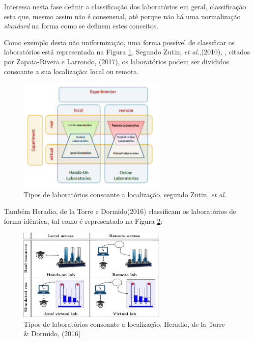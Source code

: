 Interessa nesta fase definir a classificação dos laboratórios em geral, classificação esta que, mesmo assim não é consensual, até porque não há uma normalização \textit{standard} na forma como se definem estes conceitos.

Como exemplo desta não uniformização, uma forma possível de classificar os laboratórios está representada na Figura \ref{fig:classificaçãozutin}. Segundo Zutin, \textit{et al.},(2010), \cite{zutinlab2go}, citados por Zapata-Rivera e Larrondo, (2017), \cite{Zapata-Rivera} os laboratórios podem ser divididos consoante a sua localização: local ou remota.

\begin{figure}[hbtp]
    \centering
    \includegraphics[width=0.65\textwidth]{figures/carac_lab.png}
    \caption{Tipos de laboratórios consoante a localização, segundo Zutin, \textit{et al.} \cite{zutinlab2go}}
    \label{fig:classificaçãozutin}
\end{figure}

Também Heradio, de la Torre e Dormido(2016)\cite{HERADIO20161} classificam os laboratórios de forma idêntica, tal como é representado na Figura \ref{fig:classificaçãoHeratio}:

\begin{figure}[hbtp]
    \centering
    \includegraphics[width=0.65\textwidth]{figures/caracteristica_laboratories.jpg}
    \caption{Tipos de laboratórios consoante a localização, Heradio, de la Torre \& Dormido, (2016) \cite{HERADIO20161}}
    \label{fig:classificaçãoHeratio}
\end{figure}

